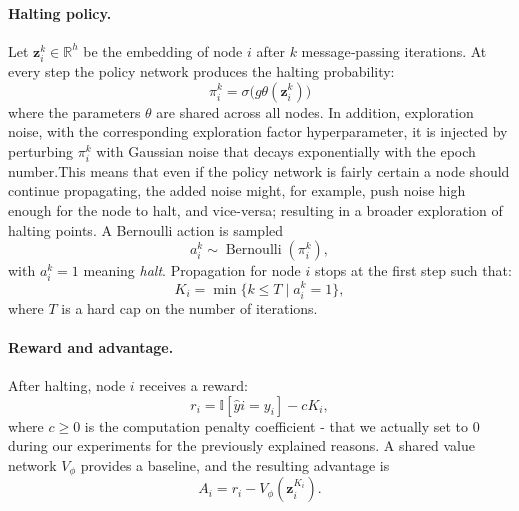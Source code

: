 \documentclass{gdl}
\begin{document}
\paragraph{Halting policy.}
Let $\mathbf{z}_i^{k}\in\mathbb{R}^h$ be the embedding of node $i$ after $k$ message‑passing iterations. At every step the policy network produces the halting probability:
\begin{equation}
\pi_i^{k}=\sigma\bigl(g{\theta}(\mathbf{z}_i^{k})\bigr)
\end{equation}
where the parameters $\theta$ are shared across all nodes. In addition, exploration noise, with the corresponding exploration factor hyperparameter, it is injected by perturbing $\pi_i^{k}$ with Gaussian noise that decays exponentially with the epoch number.This means that even if the policy network is fairly certain a node should continue propagating, the added noise might, for example, push noise high enough for the node to halt, and vice-versa; resulting in a broader exploration of halting points. A Bernoulli action is sampled
\begin{equation}
a_i^{k} \sim \operatorname{Bernoulli}(\pi_i^{k}) ,
\end{equation}
with $a_i^{k}=1$ meaning \emph{halt}. Propagation for node $i$ stops at the first step such that:
\begin{equation}
K_i = \min\{ k \le T \mid a_i^k = 1 \},
\end{equation}
where $T$ is a hard cap on the number of iterations.

\paragraph{Reward and advantage.}
After halting, node $i$ receives a reward:
\begin{equation}
r_i = \mathbb{I}[\hat{y}i = y_i] - cK_i ,
\end{equation}
where $c\ge 0$ is the computation penalty coefficient - that we actually set to 0 during our experiments for the previously explained reasons. A shared value network $V_{\phi}$ provides a baseline, and the resulting advantage is
\begin{equation}
A_i = r_i - V_{\phi}(\mathbf{z}_i^{K_i}).
\end{equation}
\end{document}
